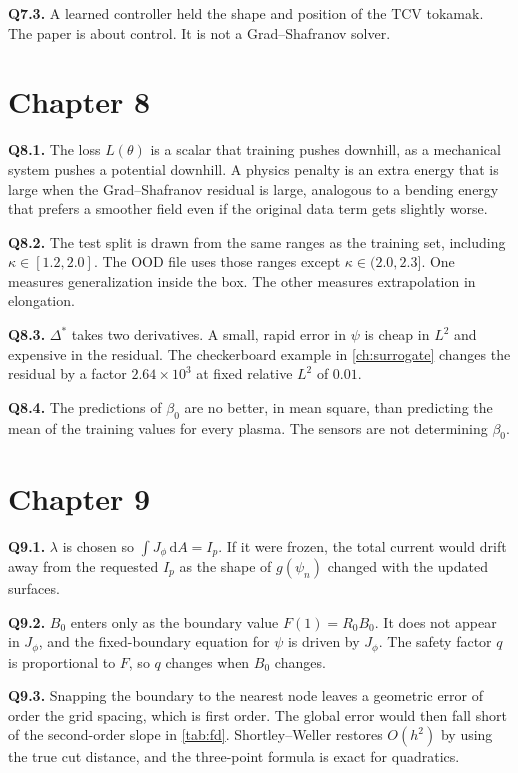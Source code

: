 \documentclass[11pt,a4paper,oneside,openany]{book}
\numberwithin{equation}{chapter}
\newcommand{\Dstar}{\Delta^{*}}
\newcommand{\psin}{\psi_{n}}
\newcommand{\Ip}{I_{p}}
\theoremstyle{definition}
\begin{document}
\textbf{Q7.3.} A learned controller held the shape and position of the TCV tokamak. The paper is about control. It is not a Grad--Shafranov solver.

\section*{Chapter 8}

\textbf{Q8.1.} The loss \(L(\theta)\) is a scalar that training pushes downhill, as a mechanical system pushes a potential downhill. A physics penalty is an extra energy that is large when the Grad--Shafranov residual is large, analogous to a bending energy that prefers a smoother field even if the original data term gets slightly worse.

\textbf{Q8.2.} The test split is drawn from the same ranges as the training set, including \(\kappa\in[1.2,2.0]\). The OOD file uses those ranges except \(\kappa\in(2.0,2.3]\). One measures generalization inside the box. The other measures extrapolation in elongation.

\textbf{Q8.3.} \(\Dstar\) takes two derivatives. A small, rapid error in \(\psi\) is cheap in \(L^{2}\) and expensive in the residual. The checkerboard example in \cref{ch:surrogate} changes the residual by a factor \(2.64\times 10^{3}\) at fixed relative \(L^{2}\) of \(0.01\).

\textbf{Q8.4.} The predictions of \(\beta_{0}\) are no better, in mean square, than predicting the mean of the training values for every plasma. The sensors are not determining \(\beta_{0}\).

\section*{Chapter 9}

\textbf{Q9.1.} \(\lambda\) is chosen so \(\int J_{\phi}\,\mathrm{d}A=\Ip\). If it were frozen, the total current would drift away from the requested \(\Ip\) as the shape of \(g(\psin)\) changed with the updated surfaces.

\textbf{Q9.2.} \(B_{0}\) enters only as the boundary value \(F(1)=R_{0} B_{0}\). It does not appear in \(J_{\phi}\), and the fixed-boundary equation for \(\psi\) is driven by \(J_{\phi}\). The safety factor \(q\) is proportional to \(F\), so \(q\) changes when \(B_{0}\) changes.

\textbf{Q9.3.} Snapping the boundary to the nearest node leaves a geometric error of order the grid spacing, which is first order. The global error would then fall short of the second-order slope in \cref{tab:fd}. Shortley--Weller restores \(O(h^{2})\) by using the true cut distance, and the three-point formula is exact for quadratics.
\end{document}
